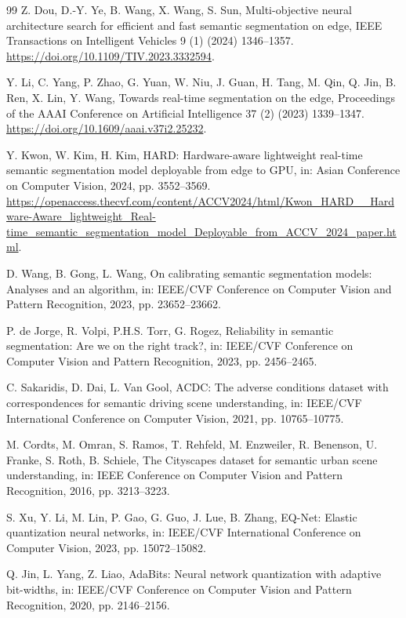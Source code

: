 \documentclass[a4paper,review,12pt]{elsarticle}
\begin{document}
\begin{thebibliography}{99}
Z. Dou, D.-Y. Ye, B. Wang, X. Wang, S. Sun,
Multi-objective neural architecture search for efficient and fast semantic segmentation on edge,
IEEE Transactions on Intelligent Vehicles 9 (1) (2024) 1346--1357.
\url{https://doi.org/10.1109/TIV.2023.3332594}.

Y. Li, C. Yang, P. Zhao, G. Yuan, W. Niu, J. Guan, H. Tang, M. Qin, Q. Jin, B. Ren, X. Lin, Y. Wang,
Towards real-time segmentation on the edge,
Proceedings of the AAAI Conference on Artificial Intelligence 37 (2) (2023) 1339--1347.
\url{https://doi.org/10.1609/aaai.v37i2.25232}.

Y. Kwon, W. Kim, H. Kim,
HARD: Hardware-aware lightweight real-time semantic segmentation model deployable from edge to GPU,
in: Asian Conference on Computer Vision, 2024, pp. 3552--3569.
\url{https://openaccess.thecvf.com/content/ACCV2024/html/Kwon_HARD__Hardware-Aware_lightweight_Real-time_semantic_segmentation_model_Deployable_from_ACCV_2024_paper.html}.

D. Wang, B. Gong, L. Wang,
On calibrating semantic segmentation models: Analyses and an algorithm,
in: IEEE/CVF Conference on Computer Vision and Pattern Recognition, 2023, pp. 23652--23662.

P. de Jorge, R. Volpi, P.H.S. Torr, G. Rogez,
Reliability in semantic segmentation: Are we on the right track?,
in: IEEE/CVF Conference on Computer Vision and Pattern Recognition, 2023, pp. 2456--2465.

C. Sakaridis, D. Dai, L. Van Gool,
ACDC: The adverse conditions dataset with correspondences for semantic driving scene understanding,
in: IEEE/CVF International Conference on Computer Vision, 2021, pp. 10765--10775.

M. Cordts, M. Omran, S. Ramos, T. Rehfeld, M. Enzweiler, R. Benenson, U. Franke, S. Roth, B. Schiele,
The Cityscapes dataset for semantic urban scene understanding,
in: IEEE Conference on Computer Vision and Pattern Recognition, 2016, pp. 3213--3223.

S. Xu, Y. Li, M. Lin, P. Gao, G. Guo, J. Lue, B. Zhang,
EQ-Net: Elastic quantization neural networks,
in: IEEE/CVF International Conference on Computer Vision, 2023, pp. 15072--15082.

Q. Jin, L. Yang, Z. Liao,
AdaBits: Neural network quantization with adaptive bit-widths,
in: IEEE/CVF Conference on Computer Vision and Pattern Recognition, 2020, pp. 2146--2156.

\end{thebibliography}
\end{document}

